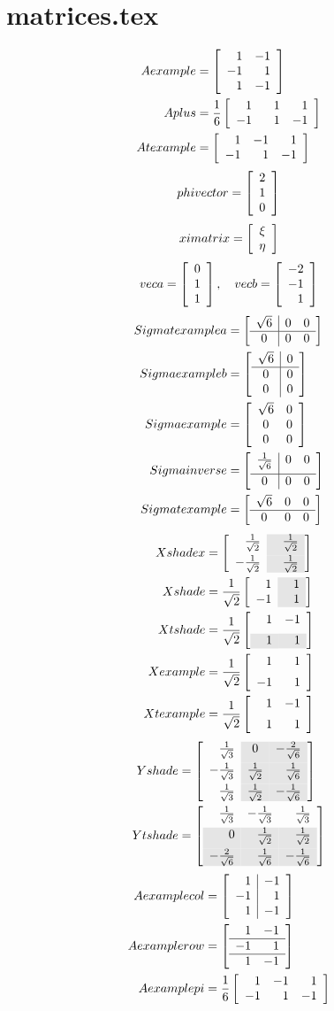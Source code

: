 \section{matrices.tex}
\begin{equation}
  \begin{split}
    Aexample &= \Aexample\\
    Aplus &= \Aplus\\
    Atexample &= \Atexample\\
  \end{split}
\end{equation}
\begin{equation}
  phivector = \left[\begin{array}{c} 2\\1\\0 \end{array}\right]
\end{equation}
\begin{equation}
  ximatrix = \left[\begin{array}{c} \xi \\ \eta \end{array}\right]
\end{equation}
\begin{equation}
  veca = \left[\begin{array}{r}0\\1\\1\end{array}\right], \quad vecb = \left[\begin{array}{r}-2\\-1\\1\end{array}\right]
\end{equation}
\begin{equation}
  \begin{split}
    Sigmatexamplea &= \Sigmatexamplea \\
    Sigmaexampleb &= \Sigmaexampleb \\
    Sigmaexample &= \Sigmaexample \\
    Sigmainverse &= \Sigmainverse \\
    Sigmatexample &= \Sigmatexample
  \end{split}
\end{equation}
\begin{equation}
  \begin{split}
    Xshadex &= \Xshadex \\
    Xshade &= \Xshade \\
    Xtshade &= \Xtshade \\
    Xexample &= \Xexample \\
    Xtexample &= \Xtexample
  \end{split}
\end{equation}
\begin{equation}
  \begin{split}
    Yshade &= \Yshade \\
    Ytshade &= \Ytshade
  \end{split}
\end{equation}
\begin{equation}
  \begin{split}
    Aexamplecol &= \left[ \begin{array}{ r|r } 1 & -1 \\ -1 & 1 \\ 1 & -1 \end{array} \right] \\
    Aexamplerow &= \left[ \begin{array}{ rr } 1 & -1 \\ \hline -1 & 1 \\ \hline 1 & -1 \end{array} \right] \\
    Aexamplepi &= \frac{1}{6} \left[\begin{array}{rrr} 1 & -1 & 1\\ -1 & 1 & -1 \end{array}\right]
  \end{split}
\end{equation}

